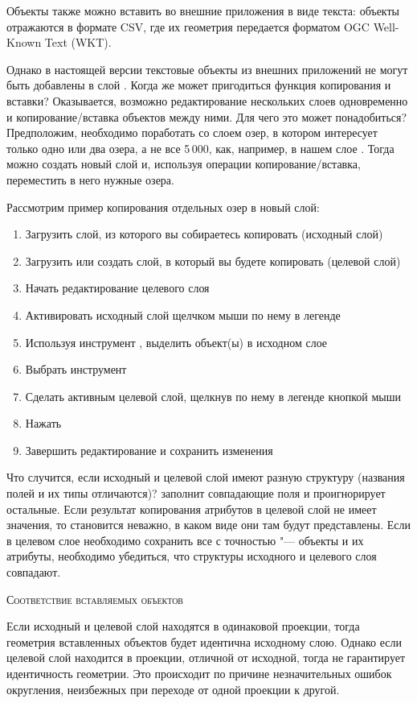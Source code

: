 Объекты также можно вставить во внешние приложения в виде текста: объекты
отражаются в формате  CSV, где их геометрия передается форматом
OGC Well-Known Text (WKT).

Однако в настоящей версии  \qg текстовые объекты из внешних приложений
\qg не могут быть добавлены в слой \qg. Когда же может пригодиться функция
копирования и вставки? Оказывается, возможно редактирование нескольких
слоев одновременно и копирование/вставка объектов между ними. Для чего это
может понадобиться? Предположим, необходимо поработать со слоем озер, в
котором интересует только одно или два озера, а не все 5\,000, как, например,
в нашем слое . Тогда можно создать новый слой и,
используя операции копирование/вставка, переместить в него нужные озера.

Рассмотрим пример копирования отдельных озер в новый слой:

\begin{enumerate}
\item Загрузить слой, из которого вы собираетесь копировать (исходный слой)
\item Загрузить или создать слой, в который вы будете копировать (целевой слой)
\item Начать редактирование целевого слоя
\item Активировать исходный слой щелчком мыши по нему в легенде
\item Используя инструмент ,
выделить объект(ы) в исходном слое
\item Выбрать инструмент 
\item Сделать активным целевой слой, щелкнув по нему в легенде кнопкой мыши
\item Нажать 
\item Завершить редактирование и сохранить изменения
\end{enumerate}

Что случится, если исходный и целевой слой имеют разную структуру (названия
полей и их типы отличаются)? \qg заполнит совпадающие поля и проигнорирует
остальные. Если результат копирования атрибутов в целевой слой не имеет
значения, то становится неважно, в каком виде они там будут представлены.
Если в целевом слое необходимо сохранить все с точностью "--- объекты и
их атрибуты, необходимо убедиться, что структуры исходного и целевого слоя
совпадают.

\begin{Tip}\caption{\textsc{Соответствие вставляемых объектов}}
Если исходный и целевой слой находятся в одинаковой проекции, тогда
геометрия вставленных объектов будет идентична исходному слою. Однако если
целевой слой находится в проекции, отличной от исходной, тогда \qg не гарантирует
идентичность геометрии. Это происходит по причине незначительных ошибок
округления, неизбежных при переходе от одной проекции к другой.
\end{Tip}


